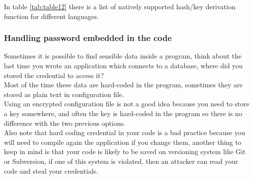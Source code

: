 In table \ref{tab:table12} there is a list of natively supported hash/key derivation function for different languages.\\



\subsubsection{Handling password embedded in the code}
Sometimes it is possible to find sensible data inside a program, think about the last time you wrote an application which connects to a database, where did you stored the credential to access it?\\
Most of the time these data are hard-coded in the program, sometimes they are stored as plain text in configuration file.\\
Using an encrypted configuration file is not a good idea because you need to store a key somewhere, and often the key is hard-coded in the program so there is no difference with the two previous options.\\

Also note that hard coding credential in your code is a bad practice because you will need to compile again the application if you change them, another thing to keep in mind is that your code is likely to be saved on versioning system like Git or Subversion, if one of this system is violated, then an attacker can read your code and steal your credentials.\\

